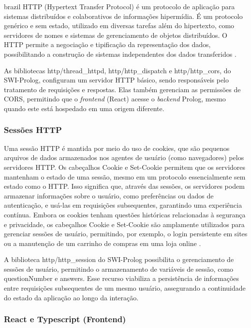 \begin{otherlanguage*}{brazil}
HTTP (Hypertext Transfer Protocol) é um protocolo de aplicação para sistemas distribuídos e colaborativos de informações hipermídia. É um protocolo genérico e sem estado, utilizado em diversas tarefas além do hipertexto, como servidores de nomes e sistemas de gerenciamento de objetos distribuídos. O HTTP permite a negociação e tipificação da representação dos dados, possibilitando a construção de sistemas independentes dos dados transferidos \cite{whatishttp}.

As bibliotecas http/thread\_httpd, http/http\_dispatch e http/http\_cors, do SWI-Prolog, configuram um servidor HTTP básico, sendo responsáveis pelo tratamento de requisições e respostas. Elas também gerenciam as permissões de CORS, permitindo que o \textit{frontend} (React) acesse o \textit{backend} Prolog, mesmo quando este está hospedado em uma origem diferente.

\subsubsection{Sessões HTTP}

Uma sessão HTTP é mantida por meio do uso de cookies, que são pequenos arquivos de dados armazenados nos agentes de usuário (como navegadores) pelos servidores HTTP. Os cabeçalhos Cookie e Set-Cookie permitem que os servidores mantenham o estado de uma sessão, mesmo em um protocolo essencialmente sem estado como o HTTP. Isso significa que, através das sessões, os servidores podem armazenar informações sobre o usuário, como preferências ou dados de autenticação, e usá-las em requisições subsequentes, garantindo uma experiência contínua. Embora os cookies tenham questões históricas relacionadas à segurança e privacidade, os cabeçalhos Cookie e Set-Cookie são amplamente utilizados para gerenciar sessões de usuário, permitindo, por exemplo, o login persistente em sites ou a manutenção de um carrinho de compras em uma loja online \cite{whatissession}.

A biblioteca http/http\_session do SWI-Prolog possibilita o gerenciamento de sessões de usuário, permitindo o armazenamento de variáveis de sessão, como questionNumber e answers. Esse recurso viabiliza a persistência de informações entre requisições subsequentes de um mesmo usuário, assegurando a continuidade do estado da aplicação ao longo da interação.

\subsubsection{React e Typescript (Frontend)}


\end{otherlanguage*}
